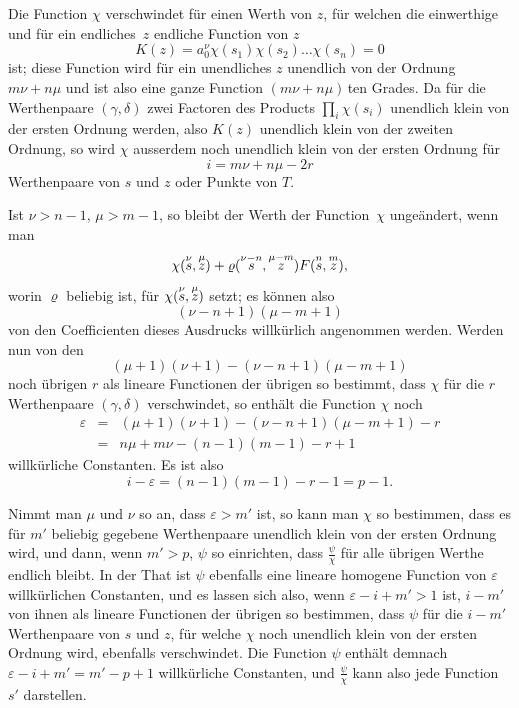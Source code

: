 \documentclass[a4paper,12pt,leqno]{article}
\begin{document}
Die Function $\chi$ verschwindet f\"{u}r einen Werth von $z$,
f\"{u}r welchen die einwerthige und f\"{u}r ein endliches~$z$
endliche Function von $z$
\[ K(z) = a_0^\nu \chi(s_1) \chi(s_2) \ldots \chi(s_n) = 0 \]
ist; diese Function wird f\"{u}r ein unendliches $z$ unendlich
von der Ordnung $m \nu + n \mu$ und ist also eine ganze Function
${(m \nu + n \mu)} \,$\-ten Grades.  Da f\"{u}r die Werthenpaare
$(\gamma, \delta)$ zwei Factoren des Products
$\prod\limits_i \chi(s_i)$ unendlich klein von der ersten Ordnung
werden, also $K(z)$ unendlich klein von der zweiten Ordnung, so
wird $\chi$ ausserdem noch unendlich klein von der ersten Ordnung
f\"{u}r
\[ i = m \nu + n \mu - 2r \]
Werthenpaare von $s$ und $z$ oder Punkte von $T$.

Ist $\nu > n - 1$, $\mu > m - 1$, so bleibt der Werth der
Function~$\chi$ unge\"{a}ndert, wenn man
\[ \chi( {\buildrel \nu \over s}, {\buildrel \mu \over z} )
      + \varrho( {\buildrel \nu - n \over s}, {\buildrel \mu - m \over z} )
        F( {\buildrel n \over s}, {\buildrel m \over z} ),\]
worin $\varrho$ beliebig ist, f\"{u}r
$\chi( {\buildrel \nu \over s}, {\buildrel \mu \over z} )$
setzt; es k\"{o}nnen also
\[ (\nu - n + 1) (\mu - m + 1) \]
von den Coefficienten dieses Ausdrucks willk\"{u}rlich angenommen
werden.  Werden nun von den
\[ (\mu + 1)(\nu + 1) - (\nu - n + 1)(\mu - m + 1) \]
noch \"{u}brigen $r$ als lineare Functionen der \"{u}brigen so
bestimmt, dass $\chi$ f\"{u}r die $r$ Werthenpaare
$(\gamma, \delta)$ verschwindet, so enth\"{a}lt die Function
$\chi$ noch
\begin{eqnarray*}
\varepsilon
   &=& (\mu + 1)(\nu + 1) - (\nu - n + 1)(\mu - m + 1) - r \\
   &=& n \mu + m \nu - (n - 1)(m - 1) - r + 1
\end{eqnarray*}
willk\"{u}rliche Constanten.  Es ist also
\[ i - \varepsilon = (n - 1)(m - 1) - r - 1 = p - 1.\]

Nimmt man $\mu$ und $\nu$ so an, dass $\varepsilon > m'$ ist, so
kann man $\chi$ so bestimmen, dass es f\"{u}r $m'$ beliebig
gegebene Werthenpaare unendlich klein von der ersten Ordnung
wird, und dann, wenn $m' > p$, $\psi$ so einrichten, dass
$\displaystyle \frac{\psi}{\chi}$
f\"{u}r alle \"{u}brigen Werthe endlich bleibt.  In der That ist
$\psi$ ebenfalls eine lineare homogene Function von $\varepsilon$
willk\"{u}rlichen Constanten, und es lassen sich also, wenn
$\varepsilon - i + m' > 1$ ist, $i - m'$ von ihnen als lineare
Functionen der \"{u}brigen so bestimmen, dass $\psi$ f\"{u}r die
$i - m'$ Werthenpaare von $s$ und $z$, f\"{u}r welche $\chi$ noch
unendlich klein von der ersten Ordnung wird, ebenfalls
verschwindet.  Die Function $\psi$ enth\"{a}lt demnach
$\varepsilon - i + m' = m' - p + 1$
willk\"{u}rliche Constanten, und
$\displaystyle \frac{\psi}{\chi}$
kann also jede Function $s'$ darstellen.
\end{document}

